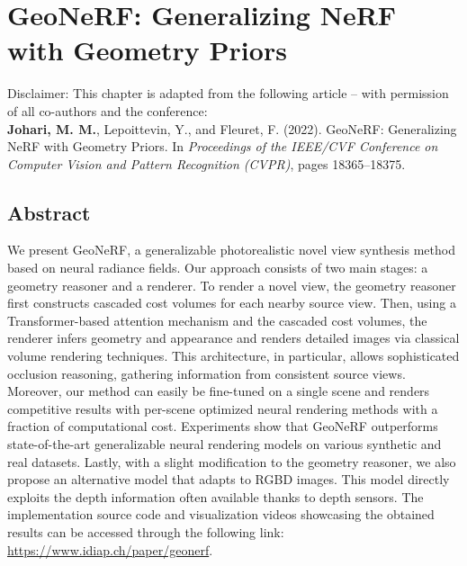 \chapter{GeoNeRF: Generalizing NeRF with Geometry Priors} \label{sec:chapter3}

\begin{tcolorbox}[colback=gray!20, boxrule=1pt, colframe=black]
  Disclaimer: This chapter is adapted from the following article – with permission of all co-authors and the conference: \\

    \textbf{Johari, M. M.}, Lepoittevin, Y., and Fleuret, F. (2022). GeoNeRF: Generalizing NeRF with Geometry Priors. In \textit{Proceedings of the IEEE/CVF Conference on Computer Vision and Pattern Recognition (CVPR)}, pages 18365–18375.
\end{tcolorbox}

\section{Abstract}

We present GeoNeRF, a generalizable photorealistic novel view synthesis method based on neural radiance fields. Our approach consists of two main stages: a geometry reasoner and a renderer. To render a novel view, the geometry reasoner first constructs cascaded cost volumes for each nearby source view. Then, using a Transformer-based attention mechanism and the cascaded cost volumes, the renderer infers geometry and appearance and renders detailed images via classical volume rendering techniques. This architecture, in particular, allows sophisticated occlusion reasoning, gathering information from consistent source views. Moreover, our method can easily be fine-tuned on a single scene and renders competitive results with per-scene optimized neural rendering methods with a fraction of computational cost. Experiments show that GeoNeRF outperforms state-of-the-art generalizable neural rendering models on various synthetic and real datasets. Lastly, with a slight modification to the geometry reasoner, we also propose an alternative model that adapts to RGBD images. This model directly exploits the depth information often available thanks to depth sensors. The implementation source code and visualization videos showcasing the obtained results can be accessed through the following link: \href{https://www.idiap.ch/paper/geonerf}{https://www.idiap.ch/paper/geonerf}.


